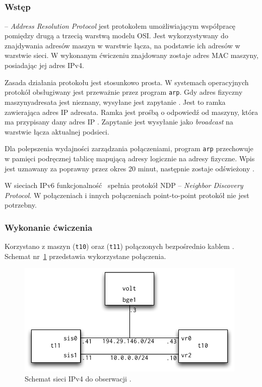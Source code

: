 \subsection{\arp}


\subsubsection{Wstęp}

\arp{} -- \emph{Address Resolution Protocol} jest protokołem umożliwiającym
współpracę pomiędzy drugą a trzecią warstwą modelu OSI. Jest wykorzystywany do
znajdywania adresów maszyn w warstwie łącza, na podstawie ich adresów w warstwie
sieci. W wykonanym ćwiczeniu znajdowany zostaje adres MAC maszyny, posiadając
jej adres IPv4.

Zasada działania protokołu \arp{} jest stosunkowo prosta. W systemach
operacyjnych protokół obsługiwany jest przeważnie przez program \texttt{arp}.
Gdy adres fizyczny maszyny\dywiz adresata jest nieznany, wysyłane jest zapytanie
\arp. Jest to ramka \eth{} zawierająca adres IP adresata. Ramka jest prośbą o
odpowiedź od maszyny, która ma przypisany dany adres IP
\cite{arp:stevens-przyklad}. Zapytanie jest wysyłanie jako \emph{broadcast}
na warstwie łącza aktualnej podsieci.

Dla polepszenia wydajności zarządzania połączeniami, program \texttt{arp}
przechowuje w pamięci podręcznej tablicę mapującą adresy logicznie na adresy
fizyczne. Wpis jest uznawany za poprawny przez okres 20 minut, następnie zostaje
odświeżony \cite{arp:stevens-cache}.

W sieciach IPv6 funkcjonalność \arp{} spełnia protokół NDP -- \emph{Neighbor
Discovery Protocol}. W połączeniach \ppp{} i innych połączeniach point-to-point
protokół \arp{} nie jest potrzebny.


\subsubsection{Wykonanie ćwiczenia}

Korzystano z maszyn \tjz{} (\texttt{t10}) oraz \tjj{} (\texttt{t11}) połączonych
bezpośrednio kablem \eth. Schemat nr~\ref{fig:arp:schemat_po_konfiguracji}
przedstawia wykorzystane połączenia.

\begin{figure}[h!]
  \centering
  \includegraphics[width=11cm]{figury/arp/schemat-po-konfiguracji.pdf}
  \caption{Schemat sieci IPv4 do obserwacji \arp.}
  \label{fig:arp:schemat_po_konfiguracji}
\end{figure}

